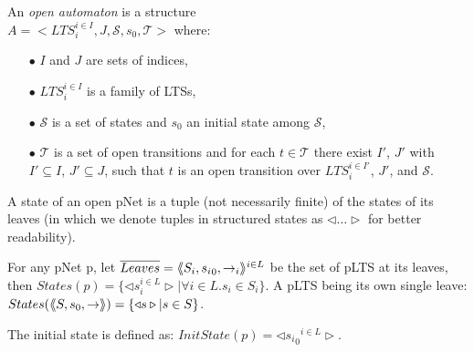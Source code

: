 \documentclass{lncs/llncs}
\begin{document}
\begin{definition}
	\label{def:open-automaton}
	An \emph{open automaton} is a structure\\ $A =
	<LTS_i^{i\in I},J,\mathcal{S},s_0,\mathcal{T}>$ where:
	\begin{itemize}
		\item[$\bullet$]  $I$ and $J$ are  sets of indices,
		\item[$\bullet$]  $LTS_i^{i\in I}$ is a family of LTSs,
		\item[$\bullet$]   $\mathcal{S}$ is a set of states and $s_0$ an initial state
		among $\mathcal{S}$,
		\item[$\bullet$] $\mathcal{T}$ is a set of open transitions and for each
		$t\in \mathcal{T}$ there exist $I'$, $J'$ with $I'\subseteq I$, $J'
		\subseteq J$, such that $t$ is an open transition over $LTS_i^{i\in I'}$, $J'$,
		and  $\mathcal{S}$.
		
	\end{itemize}
\end{definition}
	

%


\begin{definition}\label{def-states}
  A state of an open pNet is a tuple (not necessarily finite) of the
  states of its leaves (in which we denote tuples
  in structured states as $\triangleleft\ldots\triangleright$ for better readability).

  For any pNet p, let $\overline{Leaves} = \langle\hspace{-0.58ex}\langle S_i,{s_i}_0, \to_i\rangle\hspace{-0.58ex}\rangle^{i \in L}$ be the set of pLTS at its leaves,
  then $States(p) = \{\triangleleft s_i^{i\in L}
  \triangleright| \forall i\in L. s_i \in S_i\}$.
A pLTS being its own single leave:
  $States(\langle\hspace{-0.58ex}\langle S,s_0, \to\rangle\hspace{-0.58ex}\rangle) = \{\triangleleft s \triangleright| s \in S\}$.

The initial state is defined as:
$InitState(p) = \triangleleft {{s_i}_0}^{i\in L}  \triangleright$.
\end{definition}

\end{document}
